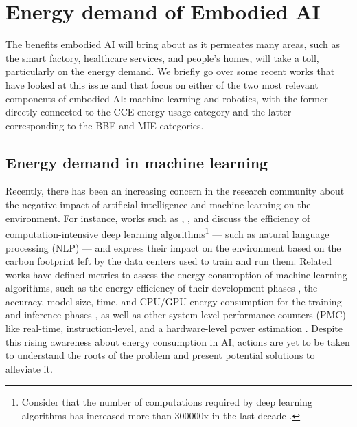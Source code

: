 \section{Energy demand of Embodied AI}\label{sec:energy_demand_embodied_ai}
The benefits embodied AI will bring about as it permeates many areas, such as the smart factory, healthcare services, and people's homes, will take a toll, particularly on the energy demand. We briefly go over some recent works that have looked at this issue and that focus on either of the two most relevant components of embodied AI: machine learning and robotics, with the former directly connected to the CCE energy usage category and the latter corresponding to the BBE and MIE categories.

\subsection{Energy demand in machine learning}
Recently, there has been an increasing concern in the research community about the negative impact of artificial intelligence and machine learning on the environment. For instance, works such as \cite{schwartz2019green}, \cite{vinuesa2020role}, and \cite{Strubell2019EnergyAP} discuss the efficiency of computation-intensive deep learning algorithms\footnote{Consider that the number of computations required by deep learning algorithms has increased more than 300000x in the last decade \cite{schwartz2019green}.} --- such as natural language processing (NLP) --- and express their impact on the environment based on the carbon footprint left by the data centers used to train and run them. Related works have defined metrics to assess the energy consumption of machine learning algorithms, such as the energy efficiency of their development phases \cite{zhou2020hulk},  the accuracy, model size, time, and CPU/GPU energy consumption for the training and inference phases \cite{Dalgren2019GreenMLA}, as well as other system level performance counters (PMC) like real-time, instruction-level, and a hardware-level power estimation \cite{garcia2019estimation}. Despite this rising awareness about energy consumption in AI, actions are yet to be taken to understand the roots of the problem and present potential solutions to alleviate it.

